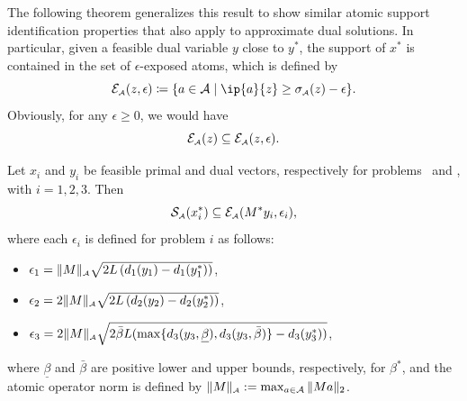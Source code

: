 The following theorem generalizes this result to show similar atomic support identification properties that also apply to approximate dual solutions. In particular, given a feasible dual variable $y$ close to $y^*$, the support of $x^*$ is contained in the set of $\epsilon$-exposed atoms, which is defined by
\begin{equation}
  \Escr\As(z, \epsilon) \coloneqq \{a\in\Ascr \mid \ip{a}{z} \geq \sigma\As(z) - \epsilon\}.
\end{equation}
Obviously, for any $\epsilon \geq 0$, we would have 
\[\mathcal{E}_{\scriptscriptstyle\mathcal{A}}(z) \subseteq \mathcal{E}_{\scriptscriptstyle\mathcal{A}}(z, \epsilon).\]

\begin{theorem}\label{thm:p0}
    Let $x_i$ and $y_i$ be feasible primal and dual vectors, respectively for
    problems \Probi\ and \Drobi, with $i = 1, 2, 3$. Then
    \begin{equation}\label{eq:1} 
      \operatorname{\mathcal{S}_{\scriptscriptstyle\mathcal{A}}}(x_i^*) \subseteq \mathcal{E}_{\scriptscriptstyle\mathcal{A}}(M^*y_i, \epsilon_i),
    \end{equation}
    where each $\epsilon_i$ is defined for problem $i$ as follows:
    \begin{itemize} 
    \item \label{thm:p1} $\epsilon_1 = \|M\|_{\scriptscriptstyle\mathcal{A}}\sqrt{2L \left( d_1(y_1) - d_1(y_1^*) \right)}$,
  
    \item \label{thm:p2} $\epsilon_2 = 2\|M\|_{\scriptscriptstyle\mathcal{A}}\sqrt{2L \left( d_2(y_2) - d_2(y_2^*) \right)}$,
      
    \item \label{thm:p3} $\epsilon_3 = 2\|M\|_{\scriptscriptstyle\mathcal{A}}\sqrt{2\bar{\beta}L (
          \max\{d_3(y_3, \underline{\beta}), d_3(y_3, \bar{\beta})\} - d_3( y_3^* ) ) }$, 
    \end{itemize}
    where $\underline{\beta}$ and $\bar{\beta}$ are positive lower and
    upper bounds, respectively, for $\beta^*$, and the atomic operator norm is defined by 
    $\|M\|_{\scriptscriptstyle\mathcal{A}}:=\max_{a\in\mathcal{A}}\|Ma\|_2$.
\end{theorem}

